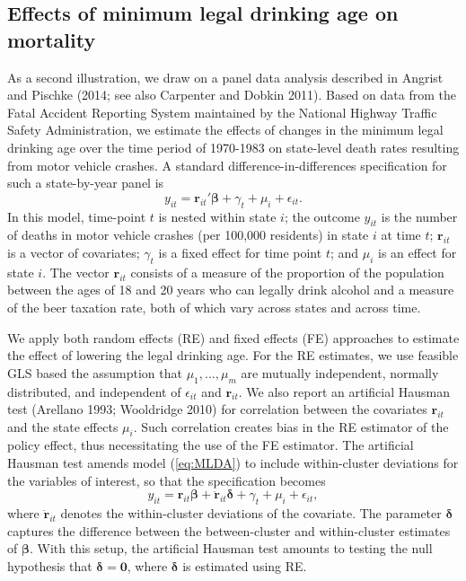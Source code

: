 \documentclass[12pt]{article}
\begin{document}
\hypertarget{effects-of-minimum-legal-drinking-age-on-mortality}{%
\subsection{Effects of minimum legal drinking age on
mortality}\label{effects-of-minimum-legal-drinking-age-on-mortality}}

As a second illustration, we draw on a panel data analysis described in
Angrist and Pischke (2014; see also Carpenter and Dobkin 2011). Based on
data from the Fatal Accident Reporting System maintained by the National
Highway Traffic Safety Administration, we estimate the effects of
changes in the minimum legal drinking age over the time period of
1970-1983 on state-level death rates resulting from motor vehicle
crashes. A standard difference-in-differences specification for such a
state-by-year panel is \begin{equation}
\label{eq:MLDA}
y_{it} = \mathbf{r}_{it}'\boldsymbol\beta + \gamma_t + \mu_i + \epsilon_{it}.
\end{equation} In this model, time-point \(t\) is nested within state
\(i\); the outcome \(y_{it}\) is the number of deaths in motor vehicle
crashes (per 100,000 residents) in state \(i\) at time \(t\);
\(\mathbf{r}_{it}\) is a vector of covariates; \(\gamma_t\) is a fixed
effect for time point \(t\); and \(\mu_i\) is an effect for state \(i\).
The vector \(\mathbf{r}_{it}\) consists of a measure of the proportion
of the population between the ages of 18 and 20 years who can legally
drink alcohol and a measure of the beer taxation rate, both of which
vary across states and across time.

We apply both random effects (RE) and fixed effects (FE) approaches to
estimate the effect of lowering the legal drinking age. For the RE
estimates, we use feasible GLS based the assumption that
\(\mu_1,...,\mu_m\) are mutually independent, normally distributed, and
independent of \(\epsilon_{it}\) and \(\mathbf{r}_{it}\). We also report
an artificial Hausman test (Arellano 1993; Wooldridge 2010) for
correlation between the covariates \(\mathbf{r}_{it}\) and the state
effects \(\mu_i\). Such correlation creates bias in the RE estimator of
the policy effect, thus necessitating the use of the FE estimator. The
artificial Hausman test amends model (\ref{eq:MLDA}) to include
within-cluster deviations for the variables of interest, so that the
specification becomes \begin{equation}
y_{it} = \mathbf{r}_{it}\boldsymbol\beta + \mathbf{\ddot{r}}_{it}\boldsymbol\delta + \gamma_t + \mu_i + \epsilon_{it},
\end{equation} where \(\mathbf{\ddot{r}}_{it}\) denotes the
within-cluster deviations of the covariate. The parameter
\(\boldsymbol\delta\) captures the difference between the
between-cluster and within-cluster estimates of \(\boldsymbol\beta\).
With this setup, the artificial Hausman test amounts to testing the null
hypothesis that \(\boldsymbol\delta = \mathbf{0}\), where
\(\boldsymbol\delta\) is estimated using RE.
\end{document}
